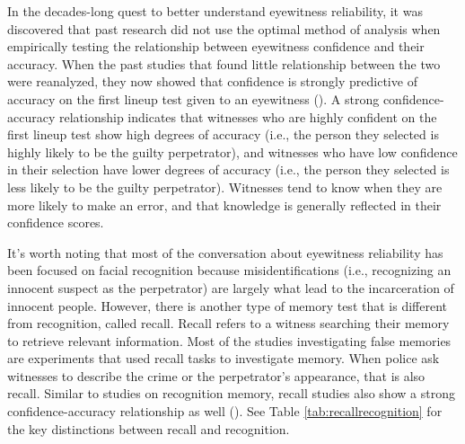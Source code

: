 \documentclass[
]{krantz}
\begin{document}
In the decades-long quest to better understand eyewitness reliability, it was discovered that past research did not use the optimal method of analysis when empirically testing the relationship between eyewitness confidence and their accuracy. When the past studies that found little relationship between the two were reanalyzed, they now showed that confidence is strongly predictive of accuracy on the first lineup test given to an eyewitness (). A strong confidence-accuracy relationship indicates that witnesses who are highly confident on the first lineup test show high degrees of accuracy (i.e., the person they selected is highly likely to be the guilty perpetrator), and witnesses who have low confidence in their selection have lower degrees of accuracy (i.e., the person they selected is less likely to be the guilty perpetrator). Witnesses tend to know when they are more likely to make an error, and that knowledge is generally reflected in their confidence scores.

It's worth noting that most of the conversation about eyewitness reliability has been focused on facial recognition because misidentifications (i.e., recognizing an innocent suspect as the perpetrator) are largely what lead to the incarceration of innocent people. However, there is another type of memory test that is different from recognition, called recall. Recall refers to a witness searching their memory to retrieve relevant information. Most of the studies investigating false memories are experiments that used recall tasks to investigate memory. When police ask witnesses to describe the crime or the perpetrator's appearance, that is also recall. Similar to studies on recognition memory, recall studies also show a strong confidence-accuracy relationship as well (). See Table \ref{tab:recallrecognition} for the key distinctions between recall and recognition.
\end{document}
